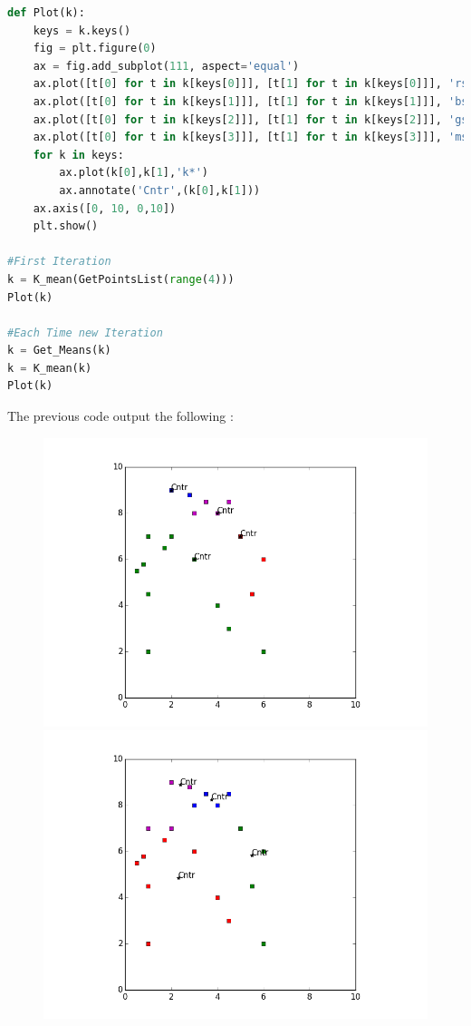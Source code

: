 \documentclass{article}
\begin{document}
\begin{lstlisting}[language=Python]
def Plot(k):
    keys = k.keys()
    fig = plt.figure(0)
    ax = fig.add_subplot(111, aspect='equal')
    ax.plot([t[0] for t in k[keys[0]]], [t[1] for t in k[keys[0]]], 'rs')
    ax.plot([t[0] for t in k[keys[1]]], [t[1] for t in k[keys[1]]], 'bs')
    ax.plot([t[0] for t in k[keys[2]]], [t[1] for t in k[keys[2]]], 'gs')
    ax.plot([t[0] for t in k[keys[3]]], [t[1] for t in k[keys[3]]], 'ms')
    for k in keys:
        ax.plot(k[0],k[1],'k*')
        ax.annotate('Cntr',(k[0],k[1]))
    ax.axis([0, 10, 0,10])
    plt.show()

#First Iteration
k = K_mean(GetPointsList(range(4)))
Plot(k)

#Each Time new Iteration
k = Get_Means(k)
k = K_mean(k)
Plot(k)
\end{lstlisting}
The previous code output the following : 
\begin{figure}[H]
\includegraphics[scale=0.5,trim={3cm 1cm 3cm 1cm},clip]{1.png}
\includegraphics[scale=0.5,trim={3cm 1cm 3cm 1cm},clip]{2.png}\\

\end{figure}
\end{document}
